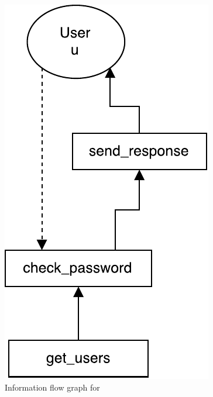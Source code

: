 
\begin{figure}
  \centering
  \includegraphics[scale=0.8]{figures/dlm_check_password}
  \caption{Information flow graph for }
  \label{example:graph:check_password}
\end{figure}
